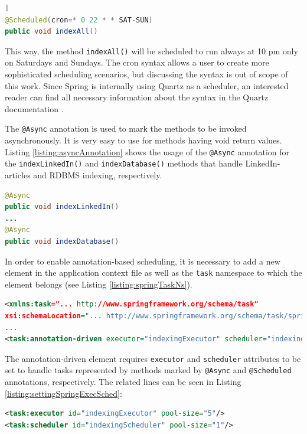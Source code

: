 \begin{lstlisting}[language=Java, caption={Example of a Cron Expression.}, label={listing:cronExpression}]]
@Scheduled(cron=* 0 22 * * SAT-SUN)
public void indexAll()
\end{lstlisting}


This way, the method \texttt{indexAll()} will be scheduled to run always at 10 pm only on Saturdays and Sundays. 
The cron syntax allows a user to create more sophisticated scheduling scenarios, but discussing the syntax is out of scope of this work. 
Since Spring is internally using Quartz as a scheduler, an interested reader can find all necessary information about the syntax in the Quartz documentation \cite{QuartzDoc}.

The \texttt{@Async} annotation is used to mark the methods to be invoked asynchronously.
It is very easy to use for methods having void return values.
Listing \ref{listing:asyncAnnotation} shows the usage of the \texttt{@Async} annotation for the \texttt{indexLinkedIn()} and \texttt{indexDatabase()} methods that handle LinkedIn-articles and RDBMS indexing, respectively.


\begin{lstlisting}[language=Java, caption={Using the \texttt{@Async} Annotation.}, label={listing:asyncAnnotation}]
@Async
public void indexLinkedIn()
...
@Async
public void indexDatabase()
\end{lstlisting}

In order to enable annotation-based scheduling, it is necessary to add a new element in the application context file as well as the \texttt{task} namespace to which the element belongs (see Listing \ref{listing:springTaskNs}).

\begin{lstlisting}[language=XML, caption={Using task namespace}, label={listing:springTaskNs}]
<xmlns:task="... http://www.springframework.org/schema/task" 
xsi:schemaLocation="... http://www.springframework.org/schema/task/spring-task.xsd">
...
<task:annotation-driven executor="indexingExecutor" scheduler="indexingScheduler"/>
\end{lstlisting}

The annotation-driven element requires \texttt{executor} and \texttt{scheduler} attributes to be set to handle tasks represented by methods marked by \texttt{@Async} and \texttt{@Scheduled} annotations, respectively.
The related lines can be seen in Listing \ref{listing:settingSpringExecSched}:

\begin{lstlisting}[language=XML, caption={Setting Spring Executer and Scheduler.}, label={listing:settingSpringExecSched}]
<task:executor id="indexingExecutor" pool-size="5"/> 
<task:scheduler id="indexingScheduler" pool-size="1"/>
\end{lstlisting}


